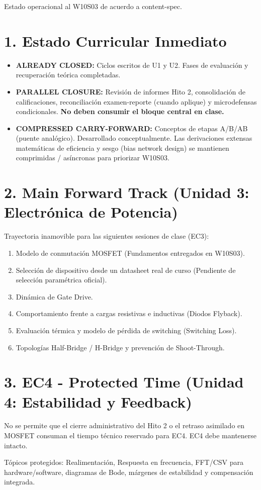 \documentclass[11pt, a4paper]{article}
\begin{document}
\begin{tcolorbox}[colback=black!5, colframe=black, title=\textbf{INTERNAL REGISTRY: EC3/EC4 Semester Trajectory Map}]
    Estado operacional al W10S03 de acuerdo a content-spec.
\end{tcolorbox}

\section*{1. Estado Curricular Inmediato}
\begin{itemize}
    \item \textbf{ALREADY CLOSED:} Ciclos escritos de U1 y U2. Fases de evaluación y recuperación teórica completadas.
    \item \textbf{PARALLEL CLOSURE:} Revisión de informes Hito 2, consolidación de calificaciones, reconciliación examen-reporte (cuando aplique) y microdefensas condicionales. \textbf{No deben consumir el bloque central en clase.}
    \item \textbf{COMPRESSED CARRY-FORWARD:} Conceptos de etapas A/B/AB (puente analógico). Desarrollado conceptualmente. Las derivaciones extensas matemáticas de eficiencia y sesgo (bias network design) se mantienen comprimidas / asíncronas para priorizar W10S03.
\end{itemize}

\section*{2. Main Forward Track (Unidad 3: Electrónica de Potencia)}
Trayectoria inamovible para las siguientes sesiones de clase (EC3):
\begin{enumerate}
    \item Modelo de conmutación MOSFET (Fundamentos entregados en W10S03).
    \item Selección de dispositivo desde un datasheet real de curso (Pendiente de selección paramétrica oficial).
    \item Dinámica de Gate Drive.
    \item Comportamiento frente a cargas resistivas e inductivas (Diodos Flyback).
    \item Evaluación térmica y modelo de pérdida de switching (Switching Loss).
    \item Topologías Half-Bridge / H-Bridge y prevención de Shoot-Through.
\end{enumerate}

\section*{3. EC4 - Protected Time (Unidad 4: Estabilidad y Feedback)}
\begin{tcolorbox}[colback=red!5, colframe=red!80!black, title=\textbf{RULE: TIMELINE PROTECTION}]
    No se permite que el cierre administrativo del Hito 2 o el retraso asimilado en MOSFET consuman el tiempo técnico reservado para EC4. EC4 debe mantenerse intacto.
\end{tcolorbox}
Tópicos protegidos: Realimentación, Respuesta en frecuencia, FFT/CSV para hardware/software, diagramas de Bode, márgenes de estabilidad y compensación integrada.
\end{document}
